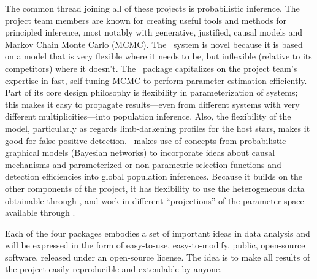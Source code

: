 \documentclass[letterpaper,12pt]{article}
\newcommand{\kplr}{\package{kplr}}
\newcommand{\Untrendy}{\package{Untrendy}}
\newcommand{\Bart}{\package{Bart}}
\newcommand{\TheCreator}{\package{TheCreator}}
\begin{document}
The common thread joining all of these projects is probabilistic
inference.  The project team members are known for creating useful
tools and methods for principled inference, most notably with
generative, justified, causal models and Markov Chain Monte Carlo
(MCMC).  The \Untrendy\ system is novel because it is based on a model
that is very flexible where it needs to be, but inflexible (relative
to its competitors) where it doesn't.  The \Bart\ package capitalizes
on the project team's expertise in fast, self-tuning MCMC to perform
parameter estimation efficiently.  Part of its core design philosophy
is flexibility in parameterization of systems; this makes it easy to
propagate results---even from different systems with very different
multiplicities---into population inference.  Also, the flexibility of
the model, particularly as regards limb-darkening profiles for the
host stars, makes it good for false-positive detection.
\TheCreator\ makes use of concepts from probabilistic graphical models
(Bayesian networks) to incorporate ideas about causal mechanisms and
parameterized or non-parametric selection functions and detection efficiencies into global population inferences.
Because it builds on the other components of the project, it has
flexibility to use the heterogeneous data obtainable through \kplr,
and work in different ``projections'' of the parameter space available
through \Bart.

Each of the four packages embodies a set of important ideas in data
analysis and will be expressed in the form of easy-to-use,
easy-to-modify, public, open-source software, released under an
open-source license.  The idea is to make all results of the project
easily reproducible and extendable by anyone.
\end{document}
